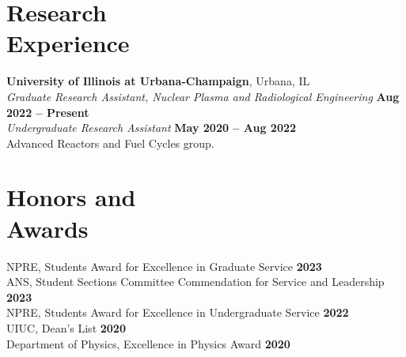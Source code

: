 \documentclass[margin,line]{resume}
\begin{document}
\begin{resume}
    \section{\mysidestyle Research\\Experience}
    \textbf{University of Illinois at Urbana-Champaign}, Urbana, IL\\
                \textsl{Graduate Research Assistant, Nuclear Plasma and Radiological Engineering} \hfill \textbf{Aug 2022 -- Present}\\
                \textsl{Undergraduate Research Assistant} \hfill \textbf{May 2020 -- Aug 2022}\\
                Advanced Reactors and Fuel Cycles group.



    \section{\mysidestyle Honors and\\Awards}
                NPRE, Students Award for Excellence in Graduate Service \hfill \textbf{2023}\vspace{.5mm}\\%
                ANS, Student Sections Committee Commendation for Service and Leadership \hfill \textbf{2023}\vspace{.5mm}\\%
                NPRE, Students Award for Excellence in Undergraduate Service \hfill \textbf{2022}\vspace{.5mm}\\%
                UIUC, Dean's List \hfill \textbf{2020}\vspace{.5mm}\\%
                Department of Physics, Excellence in Physics Award \hfill \textbf{2020}\vspace{.5mm}\\%



\end{resume}
\end{document}
